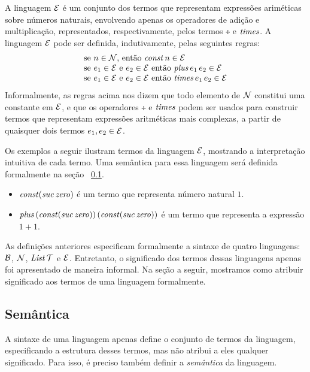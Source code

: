 \begin{Definition}\label{def:arithexp}
 A linguagem $\mathcal{E}$ é um conjunto dos termos que representam expressões ariméticas sobre números naturais, envolvendo apenas os operadores de adição e multiplicação, representados, respectivamente, pelos termos $\tplus$ e $\textit{times\/}$. A linguagem $\mathcal{E}$ pode ser definida, indutivamente, pelas seguintes regras:
  \[
  \begin{tabular}{l}
    se $n\in\Nat$, ent\~ao $\tconst\,n\in\TExp$ \\
    se $e_1 \in \TExp$  e  $e_2 \in \TExp$ ent\~ao $\tplus\,e_1\,e_2\in\TExp$\\
    se $e_1 \in \TExp$  e  $e_2 \in \TExp$ ent\~ao $\ttimes\,e_1\,e_2\in\TExp$
    \end{tabular}
  \]
Informalmente, as regras acima nos dizem que todo elemento de $\mathcal{N}$ constitui uma constante em $\mathcal{E}$, e que os operadores $\tplus$ e $\textit{times\/}$ podem ser usados para construir termos que representam expressões aritméticas mais complexas, a partir de quaisquer dois termos $e_1,e_2\in\mathcal{E}$.
\end{Definition}

\begin{Example}
 Os exemplos a seguir ilustram termos da linguagem $\mathcal{E}$, mostrando a interpretação intuitiva de cada termo. Uma semântica para essa linguagem será definida formalmente na seção ~\ref{cap1:sem}.
  \begin{itemize}
    \item $\textit{const\/} (\textit{suc\/}\, \textit{zero\/})$ é um termo que representa n\'umero natural $1$.
    \item $\textit{plus\/}\, (\textit{const\/} (\textit{suc\/}\, \textit{zero\/}))\, (\textit{const\/} (\textit{suc\/} \,\textit{zero\/}))$ é um termo que representa a express\~ao $1 + 1$.
  \end{itemize}
 \end{Example}

As defini\c{c}\~oes anteriores especificam formalmente a sintaxe de quatro linguagens: $\mathcal{B}$, $\mathcal{N}$, $\textit{List\/}\,\mathcal{T}$ e $\mathcal{E}$.  Entretanto, o significado dos termos dessas linguagens apenas foi apresentado de maneira informal.  Na se\c{c}\~ao a seguir, mostramos como atribuir significado aos termos de uma linguagem formalmente.

\subsection{Sem\^antica}\label{cap1:sem}
A sintaxe de uma linguagem apenas define o conjunto de termos da linguagem, especificando a  estrutura desses termos, mas não atribui a eles qualquer significado. Para isso, é preciso também
definir a \emph{semântica} da linguagem.

